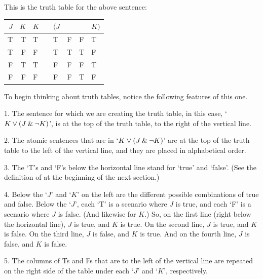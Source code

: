 This is the truth table for the above sentence:

\begin{center}
\begin{tabular}{d d | f e e e e e}
$J$&$K$&  	$K$&\eor&$(J$&\eand&\enot&$K)$\\
\hline
 T & T & 	{T} & & {T} &F &F & {T}\Tstrut\\
 T & F & 	{F} & & {T} &T &T & {F}\\
 F & T & 	{T} & & {F} &F &F & {T}\\
 F & F & 	{F} & & {F} &F &T & {F}
\end{tabular}
\end{center}
To begin thinking about truth tables, notice the following features of this one.
\begin{earg}
\item[1.] The sentence for which we are creating the truth table, in this case, `$K \vee (J \mathbin{\&} {\neg} K)$', is at the top of the truth table, to the right of the vertical line.
\item[2.] The atomic sentences that are in `$K \vee (J \mathbin{\&} {\neg} K)$' are at the top of the truth table to the left of the vertical line, and they are placed in alphabetical order. 
\item[3.] The `T's and `F's below the horizontal line stand for `true' and `false'. (See the definition of  at the beginning of the next section.)
\item[4.] Below the `$J$' and `$K$' on the left are the different possible combinations of true and false. Below the `$J$', each `T’ is a scenario where $J$ is true, and each `F’ is a scenario where $J$ is false. (And likewise for $K$.) So, on the first line (right below the horizontal line), $J$ is true, and $K$ is true. On the second line, $J$ is true, and $K$ is false. On the third line, $J$ is false, and $K$ is true. And on the fourth line, $J$ is false, and $K$ is false. 
\item[5.] The columns of Ts and Fs that are to the left of the vertical line are repeated on the right side of the table under each `$J$' and `$K$', respectively. 
\end{earg}

